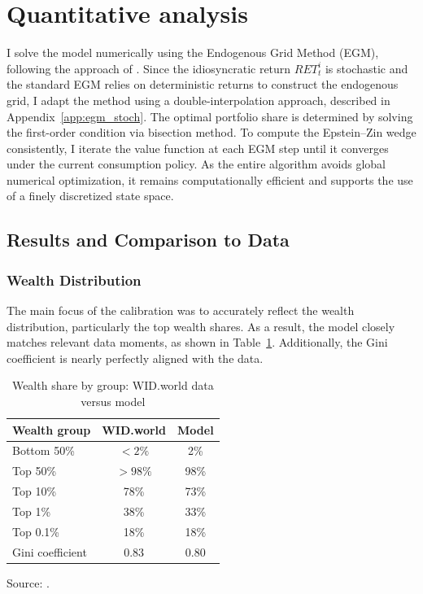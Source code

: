 \documentclass[12pt]{article}
\begin{document}
\section{Quantitative analysis}
\label{sec:analysis}

I solve the model numerically using the Endogenous Grid Method (EGM), following the approach of \textcite{carroll2006}. Since the idiosyncratic return $RET_t^i$ is stochastic and the standard EGM relies on deterministic returns to construct the endogenous grid, I adapt the method using a double-interpolation approach, described in Appendix~\ref{app:egm_stoch}. The optimal portfolio share is determined by solving the first-order condition via bisection method. To compute the Epstein–Zin wedge consistently, I iterate the value function at each EGM step until it converges under the current consumption policy. As the entire algorithm avoids global numerical optimization, it remains computationally efficient and supports the use of a finely discretized state space.

\subsection{Results and Comparison to Data}

\subsubsection{Wealth Distribution}

The main focus of the calibration was to accurately reflect the wealth distribution, particularly the top wealth shares. As a result, the model closely matches relevant data moments, as shown in Table~\ref{tab:wealth_comparison}. Additionally, the Gini coefficient is nearly perfectly aligned with the data.

\begin{table}[htbp]
\centering
\caption{Wealth share by group: WID.world data versus model}
\label{tab:wealth_comparison}
\begin{tabular}{@{} lcc @{}}
\toprule
\textbf{Wealth group} & \textbf{WID.world} & \textbf{Model} \\
\midrule
Bottom 50\%      & $<2\%$  & 2\%   \\
Top 50\%         & $>98\%$ & 98\%  \\
Top 10\%         & 78\%    & 73\%  \\
Top 1\%          & 38\%    & 33\%  \\
Top 0.1\%        & 18\%    & 18\%  \\
\hline
Gini coefficient & 0.83    & 0.80  \\
\bottomrule
\end{tabular}

\vspace{0.5em}
\begin{minipage}{0.9\linewidth}
\small Source: \textcite{wid2023}.
\end{minipage}
\end{table}
\end{document}
